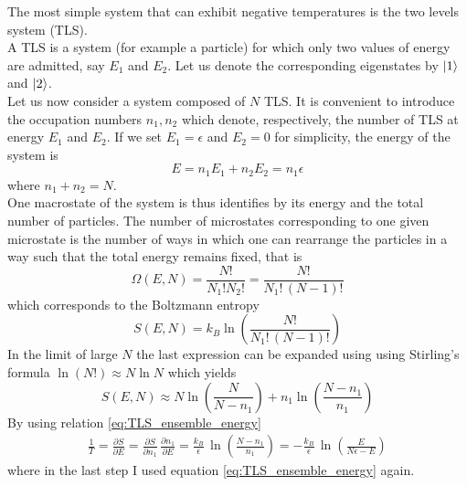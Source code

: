 The most simple system that can exhibit negative temperatures is the two levels system (TLS). \\
A TLS is a system (for example a particle) for which only two values of energy are admitted, say $E_1$ and $E_2$. Let us denote the 
corresponding eigenstates by $\left| 1 \right\rangle$ and $\left| 2 \right\rangle$. \\
Let us now consider a system composed of $N$ TLS. It is convenient to introduce the occupation numbers $n_1, n_2$ which denote,
respectively, the number of TLS at energy $E_1$ and $E_2$. If we set $E_1=\epsilon$ and $E_2=0$ for simplicity, the energy of the system is
\begin{equation}
    E = n_1 E_1 + n_2 E_2 = n_1\epsilon
    \label{eq:TLS_ensemble_energy}
\end{equation}
where $n_1 + n_2 = N$. \\
One macrostate of the system is thus identifies by its energy and the total number of particles. The number of microstates corresponding 
to one given microstate is the number of ways in which one can rearrange the particles in a way such that the total energy remains fixed, that is 
\begin{equation*}
    \Omega(E, N) = \frac{N!}{N_1!N_2!} = \frac{N!}{N_1! \, (N-1)!}
\end{equation*}
which corresponds to the Boltzmann entropy 
\begin{equation*}
    S(E, N) = k_B\ln\left(\frac{N!}{N_1! \, (N-1)!}\right)
\end{equation*}
In the limit of large $N$ the last expression can be expanded using using Stirling's formula $\ln(N!) \approx N\ln N$ which yields 
\begin{equation*}
    S(E, N) \approx N \ln \left(\frac{N}{N-n_1}\right) + n_1 \ln\left(\frac{N-n_1}{n_1}\right)
\end{equation*}
By using relation \ref{eq:TLS_ensemble_energy}
\begin{gather*}
    \frac{1}{T} = \frac{\partial S}{\partial E} = \frac{\partial S}{\partial n_1} \, \frac{\partial n_1}{\partial E} =
    \frac{k_B}{\epsilon} \, \ln\left(\frac{N - n_1}{n_1}\right) = -\frac{k_B}{\epsilon} \, \ln\left(\frac{E}{N\epsilon - E}\right)
\end{gather*}
where in the last step I used equation \ref{eq:TLS_ensemble_energy} again. \\
